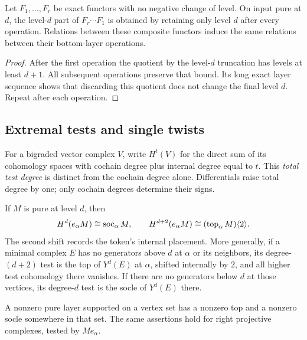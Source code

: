 \begin{lemma}\label{lay:bottom}
Let $F_1,\ldots,F_r$ be exact functors with no negative change of
level.  On input pure at $d$, the level-$d$ part of
$F_r\cdots F_1$ is obtained by retaining only level $d$ after every
operation.  Relations between these composite functors induce the same
relations between their bottom-layer operations.
\end{lemma}

\begin{proof}
After the first operation the quotient by the level-$d$ truncation
has levels at least $d+1$.  All subsequent operations preserve that
bound.  Its long exact layer sequence shows that discarding this
quotient does not change the final level $d$.  Repeat after each
operation.
\end{proof}

\subsection{Extremal tests and single twists}

For a bigraded vector complex $V$, write $H^t(V)$ for the direct sum
of its cohomology spaces with cochain degree plus internal degree
equal to $t$.  This \emph{total test degree} is distinct from the
cochain degree alone.  Differentials raise total degree by one; only
cochain degrees determine their signs.

\begin{lemma}\label{lay:extremal}
If $M$ is pure at level $d$, then
\begin{equation}
 H^d(e_\alpha M)\cong\operatorname{soc}_\alpha M,
 \qquad
 H^{d+2}(e_\alpha M)\cong(\operatorname{top}_\alpha M)\langle2\rangle.
 \label{lay:extremal-formula}
\end{equation}
The second shift records the token's internal placement.  More
generally, if a minimal complex $E$ has no generators above $d$ at
$\alpha$ or its neighbors, its degree-$(d+2)$ test is the top of
$Y^d(E)$ at $\alpha$, shifted internally by $2$, and all higher test
cohomology there vanishes.  If there are no generators below $d$ at
those vertices, its degree-$d$ test is the socle of $Y^d(E)$ there.

A nonzero pure layer supported on a vertex set has a nonzero top and
a nonzero socle somewhere in that set.  The same assertions hold for
right projective complexes, tested by $Me_\alpha$.
\end{lemma}

